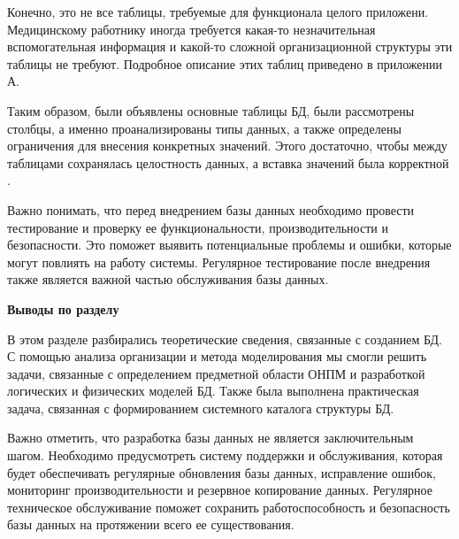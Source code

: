 Конечно, это не все таблицы, требуемые для функционала целого приложени. Медицинскому работнику иногда требуется какая-то незначительная вспомогательная информация и какой-то сложной организационной структуры эти таблицы не требуют. Подробное описание этих таблиц приведено в приложении А.

Таким образом, были объявлены основные таблицы БД, были рассмотрены столбцы, а именно проанализированы типы данных, а также определены ограничения для внесения конкретных значений. Этого достаточно, чтобы между таблицами сохранялась целостность данных, а вставка значений была корректной \cite{online1, online2, online3}.

Важно понимать, что перед внедрением базы данных необходимо провести тестирование и проверку ее функциональности, производительности и безопасности. Это поможет выявить потенциальные проблемы и ошибки, которые могут повлиять на работу системы. Регулярное тестирование после внедрения также является важной частью обслуживания базы данных.


\textbf{Выводы по разделу}

В этом разделе разбирались теоретические сведения, связанные с созданием БД. С помощью анализа организации и метода моделирования мы смогли решить задачи, связанные с определением предметной области ОНПМ и разработкой логических и физических моделей БД. Также была выполнена практическая задача, связанная с формированием системного каталога структуры БД.

Важно отметить, что разработка базы данных не является заключительным шагом. Необходимо предусмотреть систему поддержки и обслуживания, которая будет обеспечивать регулярные обновления базы данных, исправление ошибок, мониторинг производительности и резервное копирование данных. Регулярное техническое обслуживание поможет сохранить работоспособность и безопасность базы данных на протяжении всего ее существования.